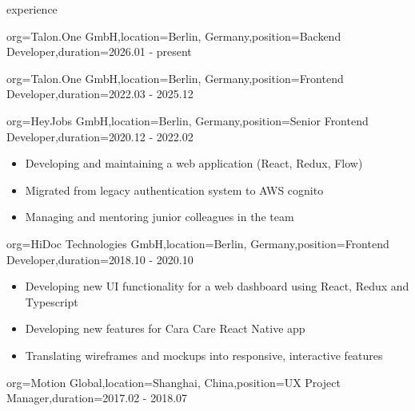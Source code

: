 \documentclass{resume}
\begin{document}
\begin{ResumeSection}{experience}
    \begin{ResumeSubsection}{org={Talon.One GmbH},location={Berlin, Germany},position={Backend Developer},duration={2026.01 - present}}
    \end{ResumeSubsection}
    \begin{ResumeSubsection}{org={Talon.One GmbH},location={Berlin, Germany},position={Frontend Developer},duration={2022.03 - 2025.12}}
    \end{ResumeSubsection}

    \begin{ResumeSubsection}{org={HeyJobs GmbH},location={Berlin, Germany},position={Senior Frontend Developer},duration={2020.12 - 2022.02}}
        \begin{itemize}
            \item Developing and maintaining a web application (React, Redux, Flow)
            \item Migrated from legacy authentication system to AWS cognito
            \item Managing and mentoring junior colleagues in the team
        \end{itemize}
    \end{ResumeSubsection}

    \begin{ResumeSubsection}{org={HiDoc Technologies GmbH},location={Berlin, Germany},position={Frontend Developer},duration={2018.10 - 2020.10}}
        \begin{itemize}
            \item Developing new UI functionality for a web dashboard using React, Redux and Typescript
            \item Developing new features for Cara Care React Native app
            \item Translating wireframes and mockups into responsive, interactive features
        \end{itemize}
    \end{ResumeSubsection}

    \begin{ResumeSubsection}{org={Motion Global},location={Shanghai, China},position={UX Project Manager},duration={2017.02 - 2018.07}}
    \end{ResumeSubsection}
\end{ResumeSection}
\end{document}
